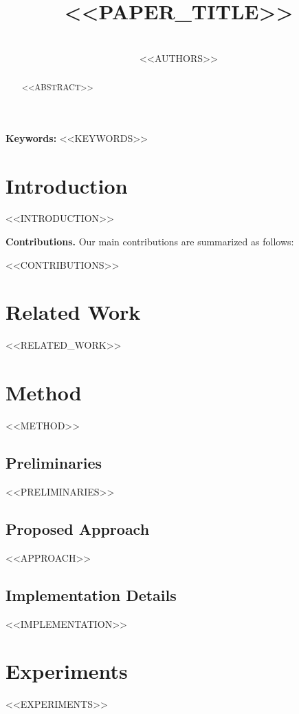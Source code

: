 \documentclass[10pt,twocolumn,letterpaper]{article}
\begin{document}
\title{<<PAPER_TITLE>>}

\author{\\
<<AUTHORS>>
}

\maketitle

\begin{abstract}
<<ABSTRACT>>
\end{abstract}

\noindent\textbf{Keywords:} <<KEYWORDS>>

\section{Introduction}
\label{sec:intro}
<<INTRODUCTION>>

\textbf{Contributions.} Our main contributions are summarized as follows:
\begin{itemize}
<<CONTRIBUTIONS>>
\end{itemize}

\section{Related Work}
\label{sec:related}
<<RELATED_WORK>>

\section{Method}
\label{sec:method}
<<METHOD>>

\subsection{Preliminaries}
\label{sec:prelim}
<<PRELIMINARIES>>

\subsection{Proposed Approach}
\label{sec:approach}
<<APPROACH>>

\subsection{Implementation Details}
\label{sec:implementation}
<<IMPLEMENTATION>>

\section{Experiments}
\label{sec:experiments}
<<EXPERIMENTS>>
\end{document}
